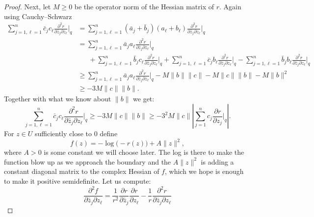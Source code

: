 \documentclass[12pt,openany]{book}
\newcommand{\snorm}[1]{\lVert {#1} \rVert}
\newcommand{\Babs}[1]{\Bigl\lvert {#1} \Bigr\rvert}
\newcommand{\abs}[1]{\left\lvert {#1} \right\rvert}
\theoremstyle{plain}
\theoremstyle{remark}
\theoremstyle{definition}
\theoremstyle{exercise}
\theoremstyle{example}
\begin{document}
\begin{proof}
\pagebreak[1]
Next, let $M \geq 0$ be the operator norm of the Hessian matrix of $r$.
Again using Cauchy--Schwarz
\begin{equation*}
\begin{split}
\sum_{j=1,\ell=1}^n
\bar{c}_j c_\ell \frac{\partial^2 r}{\partial \bar{z}_j \partial z_\ell} \Big|_q 
& =
\sum_{j=1,\ell=1}^n
( \bar{a}_j + \bar{b}_j )  (a_\ell + b_\ell) \frac{\partial^2 r}{\partial \bar{z}_j \partial z_\ell} \Big|_q 
\\
& =
\sum_{j=1,\ell=1}^n
\bar{a}_j a_\ell \frac{\partial^2 r}{\partial \bar{z}_j \partial z_\ell} \Big|_q 
\\
& \phantom{=}~
+
\sum_{j=1,\ell=1}^n
\bar{b}_j c_\ell \frac{\partial^2 r}{\partial \bar{z}_j \partial z_\ell} \Big|_q 
+
\sum_{j=1,\ell=1}^n
\bar{c}_j  b_\ell \frac{\partial^2 r}{\partial \bar{z}_j \partial z_\ell} \Big|_q 
-
\sum_{j=1,\ell=1}^n
\bar{b}_j  b_\ell \frac{\partial^2 r}{\partial \bar{z}_j \partial z_\ell} \Big|_q 
\\
& \geq
\sum_{j=1,\ell=1}^n
\bar{a}_j a_\ell \frac{\partial^2 r}{\partial \bar{z}_j \partial z_\ell} \Big|_q 
-
M\snorm{b}\snorm{c}
-
M\snorm{c}\snorm{b}
-
M\snorm{b}^2
\\
& \geq
-
3 M\snorm{c}\snorm{b} .
\end{split}
\end{equation*}
Together with what we know about
$\snorm{b}$ we get:
\begin{equation*}
\sum_{j=1,\ell=1}^n
\bar{c}_j c_\ell \frac{\partial^2 r}{\partial \bar{z}_j \partial z_\ell} \Big|_q 
\geq -3M \snorm{c} \snorm{b} %
\geq
-3^2 M \snorm{c}\abs{\sum_{j=1}^n c_j \frac{\partial r}{\partial z_j}
\Big|_q} .
\end{equation*}
For $z \in U$ sufficiently close to $0$ define
\begin{equation*}
f(z) = -\log \bigl(-r(z)\bigr) + A \snorm{z}^2 ,
\end{equation*}
where $A > 0$ is some constant we will choose later.
The log is there to make the function blow up as we approach the boundary
and the $A \snorm{z}^2$ is adding a constant diagonal matrix to the complex
Hessian of $f$, which we hope is enough to make it positive semidefinite.
Let us compute:
\begin{equation*}
\frac{\partial^2 f}{\partial \bar{z}_j \partial z_\ell}
=
\frac{1}{r^2}
\frac{\partial r}{\partial \bar{z}_j}
\frac{\partial r}{\partial z_\ell}
-
\frac{1}{r}
\frac{\partial^2 r}{\partial \bar{z}_j \partial z_\ell} 

\end{equation*}
\end{proof}
\end{document}
